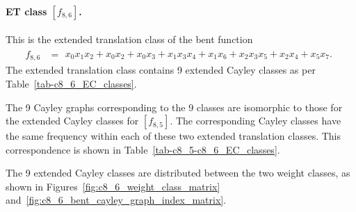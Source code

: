 \documentclass[12pt,a4paper]{article}
\begin{document}
\paragraph*{ET class $[f_{8,6}]$.}
%
%
This is the extended translation class of the bent function
\small{}
\begin{align*}
f_{ 8 , 6 } &=
\begin{array}{l}
x_{0} x_{1} x_{2} + x_{0} x_{2} + x_{0} x_{3} + x_{1} x_{3} x_{4} + x_{1} x_{6} + x_{2} x_{3} x_{5}
+ x_{2} x_{4} + x_{5} x_{7}.
\end{array}
\end{align*}
\normalsize{}
The extended translation class contains 9 extended Cayley classes as per Table~\ref{tab-c8_6_EC_classes}.

The 9 Cayley graphs corresponding to the 9 classes are isomorphic to those for the extended Cayley classes for $[f_{8,5}]$.
The corresponding Cayley classes have the same frequency within each of these two extended translation classes.
This correspondence is shown in Table~\ref{tab-c8_5-c8_6_EC_classes}.

The 9 extended Cayley classes are distributed between the two weight classes,
as shown in Figures~\ref{fig:c8_6_weight_class_matrix} and~\ref{fig:c8_6_bent_cayley_graph_index_matrix}.
\end{document}
